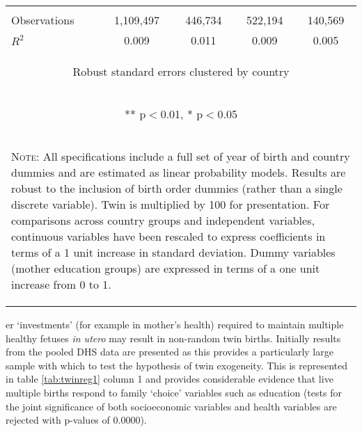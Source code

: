 \documentclass{article}[11pt,subeqn]
\begin{document}
\begin{spacing}{1.5}
\begin{table}[htpb!]
\begin{center}
\begin{tabular}{lcccc}
\vspace{4pt} & \begin{footnotesize}\end{footnotesize} & \begin{footnotesize}\end{footnotesize} & \begin{footnotesize}\end{footnotesize} & \begin{footnotesize}\end{footnotesize} \\
Observations & 1,109,497 & 446,734 & 522,194 & 140,569 \\
 $R^2$ & 0.009 & 0.011 & 0.009 & 0.005 \\ \midrule
\multicolumn{5}{c}{\begin{footnotesize} Robust standard errors clustered by country \end{footnotesize}} \\
\multicolumn{5}{c}{\begin{footnotesize} ** p$<$0.01, * p$<$0.05 \end{footnotesize}} \\
\bottomrule
\multicolumn{5}{p{10cm}}{\setstretch{0.9}\begin{footnotesize}\textsc{Note:} All specifications include a full set of year of birth and country
dummies and are estimated as linear probability models.  Results are robust to the inclusion of birth order dummies (rather than a single discrete 
variable).  Twin is multiplied by 100 for presentation.  For comparisons across country groups and independent variables, continuous variables 
have been rescaled to express coefficients in terms of a 1 unit increase in standard deviation.  Dummy variables (mother education groups)
are expressed in terms of a one unit increase from 0 to 1.\end{footnotesize}}\\
\end{tabular}
\end{center}
\end{table}

\noindent er `investments' (for example in mother's health) required to maintain multiple healthy fetuses \emph{in utero} may result in 
non-random twin births. Initially results from the pooled DHS data are presented as this provides a particularly large sample with which to test the hypothesis of
twin exogeneity.  This is represented in table \ref{tab:twinreg1} column 1 and provides considerable evidence that live multiple
births respond to family `choice' variables such as education (tests for the joint significance of both socioeconomic variables and health
variables are rejected with p-values of 0.0000).


\end{spacing}
\end{document}
